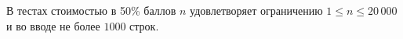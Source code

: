 В тестах стоимостью в 50\% баллов $n$ удовлетворяет ограничению $1 \le n \le 20\,000$ и во вводе не более $1000$ строк.
